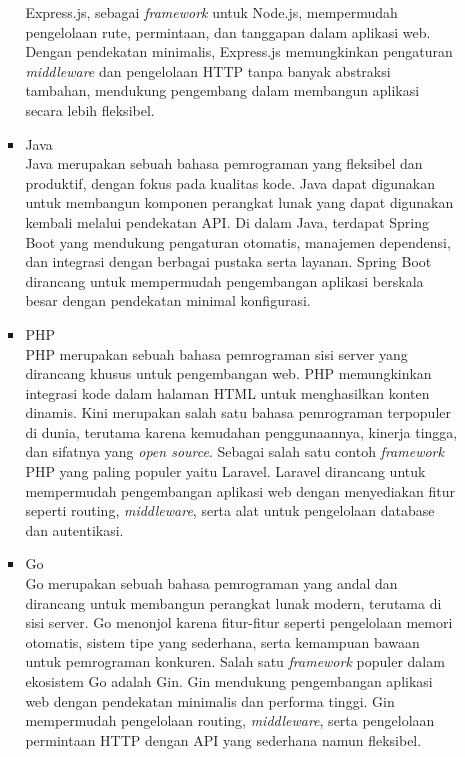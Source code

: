 \begin{enumerate}[label*=\arabic*.,ref=\arabic*]
\begin{enumerate}[label=\alph*.]
\begin{itemize}
                        Express.js, sebagai \textit{framework} untuk Node.js, mempermudah pengelolaan rute, permintaan, dan tanggapan dalam aplikasi web. Dengan pendekatan minimalis, Express.js memungkinkan pengaturan \textit{middleware} dan pengelolaan HTTP tanpa banyak abstraksi tambahan, mendukung pengembang dalam membangun aplikasi secara lebih fleksibel.
                    \item Java\\
                        Java merupakan sebuah bahasa pemrograman yang fleksibel dan produktif, dengan fokus pada kualitas kode. Java dapat digunakan untuk membangun komponen perangkat lunak yang dapat digunakan kembali melalui pendekatan API. Di dalam Java, terdapat Spring Boot yang mendukung pengaturan otomatis, manajemen dependensi, dan integrasi dengan berbagai pustaka serta layanan. Spring Boot dirancang untuk mempermudah pengembangan aplikasi berskala besar dengan pendekatan minimal konfigurasi. 
                    \item PHP\\
                        PHP merupakan sebuah bahasa pemrograman sisi server yang dirancang khusus untuk pengembangan web. PHP memungkinkan integrasi kode dalam halaman HTML untuk menghasilkan konten dinamis. Kini merupakan salah satu bahasa pemrograman terpopuler di dunia, terutama karena kemudahan penggunaannya, kinerja tingga, dan sifatnya yang \textit{open source}. Sebagai salah satu contoh \textit{framework} PHP yang paling populer yaitu Laravel. Laravel dirancang untuk mempermudah pengembangan aplikasi web dengan menyediakan fitur seperti routing, \textit{middleware}, serta alat untuk pengelolaan database dan autentikasi. 
                    \item Go\\
                        Go merupakan sebuah bahasa pemrograman yang andal dan dirancang untuk membangun perangkat lunak modern, terutama di sisi server. Go menonjol karena fitur-fitur seperti pengelolaan memori otomatis, sistem tipe yang sederhana, serta kemampuan bawaan untuk pemrograman konkuren. Salah satu \textit{framework} populer dalam ekosistem Go adalah Gin. Gin mendukung pengembangan aplikasi web dengan pendekatan minimalis dan performa tinggi. Gin mempermudah pengelolaan routing, \textit{middleware}, serta pengelolaan permintaan HTTP dengan API yang sederhana namun fleksibel. 

\end{itemize}
\end{enumerate}
\end{enumerate}
